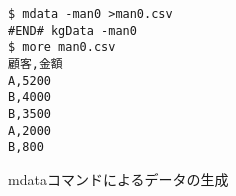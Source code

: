 \begin{figure}[htbp]
\begin{Verbatim}[baselinestretch=0.7,frame=single]
$ mdata -man0 >man0.csv
#END# kgData -man0
$ more man0.csv
顧客,金額
A,5200
B,4000
B,3500
A,2000
B,800
\end{Verbatim}
\caption{mdataコマンドによるデータの生成\label{fig:abstract0_1}}
\end{figure}
